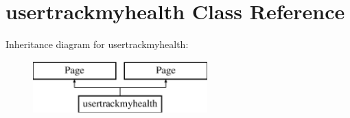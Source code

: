 \hypertarget{classusertrackmyhealth}{\section{usertrackmyhealth Class Reference}
\label{classusertrackmyhealth}
}
Inheritance diagram for usertrackmyhealth\-:\begin{figure}[H]
\begin{center}
\leavevmode
\includegraphics[height=2.000000cm]{classusertrackmyhealth}
\end{center}
\end{figure}
